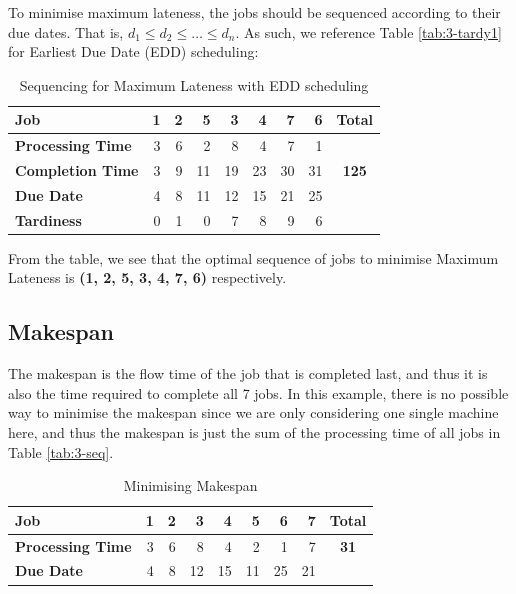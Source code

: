 \documentclass[12pt]{article}
\begin{document}
To minimise maximum lateness, the jobs should be sequenced according to their due dates. That is, $d_{1} \leq d_{2} \leq \dots \leq d_n$. As such, we reference Table \ref{tab:3-tardy1} for Earliest Due Date (EDD) scheduling: 

\begin{table}[H]
    \centering
    \begin{tabular}{l r r r r r r r | c }\toprule 
        \textbf{Job} & 1 & 2 & 5 & 3 & 4 & 7 & 6 & \textbf{Total}\\ \midrule 
        \textbf{Processing Time} & 3 & 6 & 2 & 8 & 4 & 7 & 1 \\ 
        \textbf{Completion Time} & 3 & 9 & 11 & 19 & 23 & 30 & 31 & \textbf{125} \\ 
        \textbf{Due Date} & 4 & 8 & 11 & 12 & 15 & 21 & 25 \\ 
        \textbf{Tardiness} & 0 & 1 & 0 & 7 & 8 & 9 & 6 & \\ \bottomrule
    \end{tabular}
    \caption{Sequencing for Maximum Lateness with EDD scheduling}
    \label{tab:3-maxlate}
\end{table}

\noindent From the table, we see that the optimal sequence of jobs to minimise Maximum Lateness is \textbf{(1, 2, 5, 3, 4, 7, 6)} respectively. 

\subsection*{Makespan}

The makespan is the flow time of the job that is completed last, and thus it is also the time required to complete all 7 jobs. In this example, there is no possible way to minimise the makespan since we are only considering one single machine here, and thus the makespan is just the sum of the processing time of all jobs in Table \ref{tab:3-seq}.

\begin{table}[H]
    \centering
    \begin{tabular}{l r r r r r r r | c }\toprule 
        \textbf{Job} & 1 & 2 & 3 & 4 & 5 & 6 & 7 & \textbf{Total} \\ \midrule 
        \textbf{Processing Time} & 3 & 6 & 8 & 4 & 2 & 1 & 7 & \textbf{31} \\ 
        \textbf{Due Date} & 4 & 8 & 12 & 15 & 11 & 25 & 21 \\ \bottomrule
    \end{tabular}
    \caption{Minimising Makespan}
    \label{tab:3-makespan}
\end{table}
\end{document}
